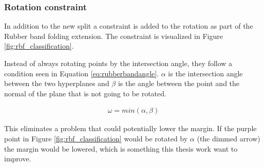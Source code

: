 \documentclass[a4paper,twoside]{bth}
\begin{document}
\subsubsection{Rotation constraint}
\par In addition to the new split a constraint is added to the rotation as part of the Rubber band folding extension. The constraint is visualized in Figure \ref{fig:rbf_classification}. 

Instead of always rotating points by the intersection angle, they follow a condition seen in Equation \ref{eq:rubberbandangle}. $\alpha$ is the intersection angle between the two hyperplanes and $\beta$ is the angle between the point and the normal of the plane that is not going to be rotated.

\begin{equation}\label{eq:rubberbandangle}
\begin{split}
    \omega = min(\alpha, \beta)
\end{split}
\end{equation}

\par This eliminates a problem that could potentially lower the margin. If the purple point in Figure \ref{fig:rbf_classification} would be rotated by $\alpha$ (the dimmed arrow) the margin would be lowered, which is something this thesis work want to improve.
\end{document}
